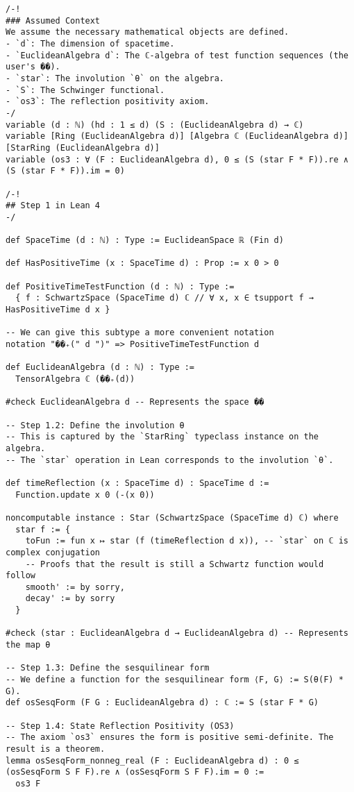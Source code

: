 \documentclass{article}
\begin{document}
\begin{lstlisting}
/-!
### Assumed Context
We assume the necessary mathematical objects are defined.
- `d`: The dimension of spacetime.
- `EuclideanAlgebra d`: The ℂ-algebra of test function sequences (the user's ��).
- `star`: The involution `θ` on the algebra.
- `S`: The Schwinger functional.
- `os3`: The reflection positivity axiom.
-/
variable (d : ℕ) (hd : 1 ≤ d) (S : (EuclideanAlgebra d) → ℂ)
variable [Ring (EuclideanAlgebra d)] [Algebra ℂ (EuclideanAlgebra d)] [StarRing (EuclideanAlgebra d)]
variable (os3 : ∀ (F : EuclideanAlgebra d), 0 ≤ (S (star F * F)).re ∧ (S (star F * F)).im = 0)

/-!
## Step 1 in Lean 4
-/

def SpaceTime (d : ℕ) : Type := EuclideanSpace ℝ (Fin d)

def HasPositiveTime (x : SpaceTime d) : Prop := x 0 > 0

def PositiveTimeTestFunction (d : ℕ) : Type :=
  { f : SchwartzSpace (SpaceTime d) ℂ // ∀ x, x ∈ tsupport f → HasPositiveTime d x }

-- We can give this subtype a more convenient notation
notation "��₊(" d ")" => PositiveTimeTestFunction d

def EuclideanAlgebra (d : ℕ) : Type :=
  TensorAlgebra ℂ (��₊(d))

#check EuclideanAlgebra d -- Represents the space ��

-- Step 1.2: Define the involution θ
-- This is captured by the `StarRing` typeclass instance on the algebra.
-- The `star` operation in Lean corresponds to the involution `θ`.

def timeReflection (x : SpaceTime d) : SpaceTime d :=
  Function.update x 0 (-(x 0))

noncomputable instance : Star (SchwartzSpace (SpaceTime d) ℂ) where
  star f := {
    toFun := fun x ↦ star (f (timeReflection d x)), -- `star` on ℂ is complex conjugation
    -- Proofs that the result is still a Schwartz function would follow
    smooth' := by sorry,
    decay' := by sorry
  }
  
#check (star : EuclideanAlgebra d → EuclideanAlgebra d) -- Represents the map θ

-- Step 1.3: Define the sesquilinear form
-- We define a function for the sesquilinear form ⟨F, G⟩ := S(θ(F) * G).
def osSesqForm (F G : EuclideanAlgebra d) : ℂ := S (star F * G)

-- Step 1.4: State Reflection Positivity (OS3)
-- The axiom `os3` ensures the form is positive semi-definite. The result is a theorem.
lemma osSesqForm_nonneg_real (F : EuclideanAlgebra d) : 0 ≤ (osSesqForm S F F).re ∧ (osSesqForm S F F).im = 0 :=
  os3 F


\end{lstlisting}
\end{document}

